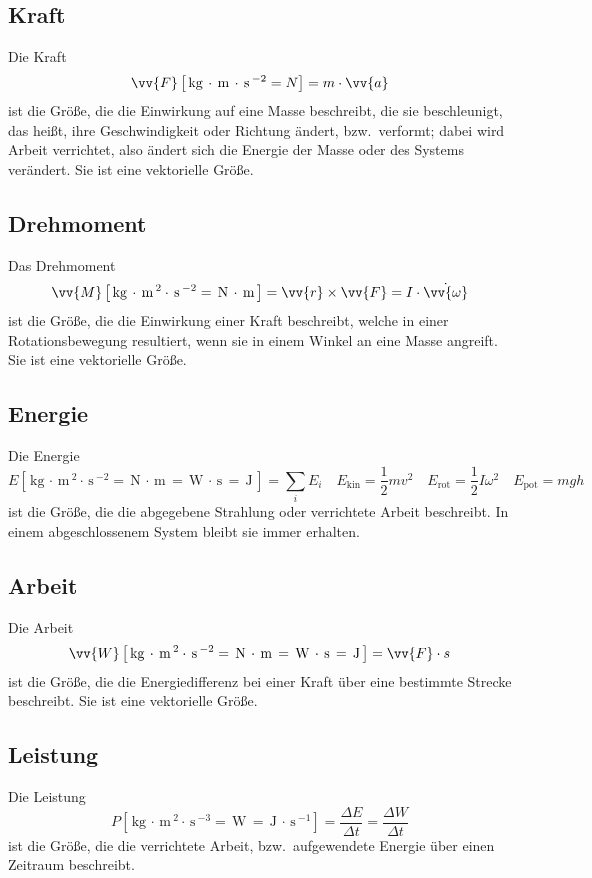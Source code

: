 \documentclass[a4paper,12pt]{article}
\numberwithin{equation}{section}
\begin{document}
\subsection{Kraft}
Die Kraft
\[ 
        \vv{F}\left[\,\text{kg}\,\cdot \,\text{m}\,\cdot \,\text{s}\, ^{-2}=N\right]=m\cdot \vv{a}
\] 
ist die Größe, die die Einwirkung auf eine Masse beschreibt, die sie beschleunigt, das heißt, ihre Geschwindigkeit oder Richtung ändert, bzw.\ verformt; dabei wird Arbeit verrichtet, also ändert sich die Energie der Masse oder des Systems verändert. Sie ist eine vektorielle Größe. 

\subsection{Drehmoment}
Das Drehmoment
\[ 
        \vv{M}\left[\,\text{kg}\,\cdot \,\text{m}\,^2\cdot \,\text{s}\, ^{-2}=\,\text{N}\,\cdot \,\text{m}\,\right]=\vv{r}\times \vv{F}=I\cdot \dot{\vv{\omega }}
\] 
ist die Größe, die die Einwirkung einer Kraft beschreibt, welche in einer Rotationsbewegung resultiert, wenn sie in einem Winkel an eine Masse angreift. Sie ist eine vektorielle Größe.

\subsection{Energie}
Die Energie
\[ 
        E\left[\,\text{kg}\,\cdot \,\text{m}\,^2\cdot \,\text{s}\, ^{-2}=\,\text{N}\,\cdot \,\text{m}\,=\,\text{W}\,\cdot \,\text{s}\,=\,\text{J}\,\right]=\sum_{i}^{}E_i\quad E_{\text{kin}}=\dfrac{1}{2}mv^2\quad E_{\text{rot}}=\dfrac{1}{2}I\omega ^2\quad E_{\text{pot}}=mgh
\] 
ist die Größe, die die abgegebene Strahlung oder verrichtete Arbeit beschreibt. In einem abgeschlossenem System bleibt sie immer erhalten.

\subsection{Arbeit}
Die Arbeit
\[ 
        \vv{W}\left[\,\text{kg}\,\cdot \,\text{m}\,^2\cdot \,\text{s}\, ^{-2}=\,\text{N}\,\cdot \,\text{m}\,=\,\text{W}\,\cdot \,\text{s}\,=\,\text{J}\,\right]=\vv{F}\cdot s
\] 
ist die Größe, die die Energiedifferenz bei einer Kraft über eine bestimmte Strecke beschreibt. Sie ist eine vektorielle Größe.

\subsection{Leistung}
Die Leistung
\[ 
        P\left[\,\text{kg}\,\cdot \,\text{m}\,^2\cdot \,\text{s}\, ^{-3}=\,\text{W}\,=\,\text{J}\,\cdot \,\text{s}\, ^{-1}\right]=\dfrac{\Delta E}{\Delta t}=\dfrac{\Delta W}{\Delta t}
\] 
ist die Größe, die die verrichtete Arbeit, bzw.\ aufgewendete Energie über einen Zeitraum beschreibt.
\end{document}
